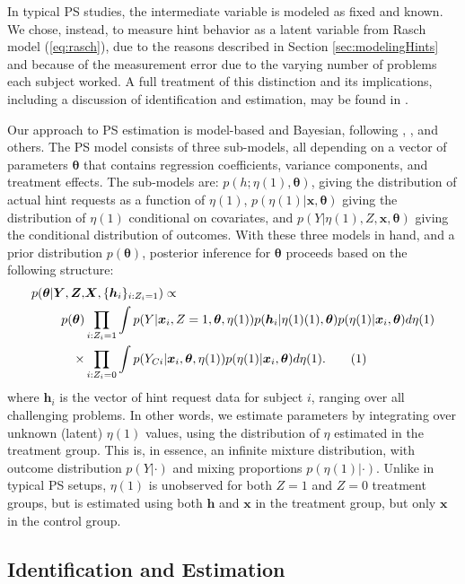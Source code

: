 \documentclass{article}
\newcommand{\yci}{Y_{Ci}}
\newcommand\numberthis{\addtocounter{equation}{1}\tag{\theequation}}
\begin{document}
In typical PS studies, the intermediate variable is modeled as fixed
and known.
We chose, instead, to measure hint behavior as a latent variable from
Rasch model (\ref{eq:rasch}), due to the reasons described in Section
\ref{sec:modelingHints} and because of the measurement error
due to the varying number of problems each subject worked.
A full treatment of this distinction and its implications, including a
discussion of identification and estimation, may be found in
\citet{aoas}.

Our approach to PS estimation is model-based and Bayesian, following
\citet{page2012principal}, \citet{feller2016compared},
\citet{schwartz2011bayesian} and others.
The PS model consists of three sub-models, all depending on a
 vector of parameters $\bm{\theta}$ that contains regression
 coefficients, variance components, and treatment effects.
The sub-models are:
$p(h;\eta(1),\bm{\theta})$, giving the distribution of actual hint
requests as a function of $\eta(1)$, $p(\eta(1)|\bm{x},\bm{\theta})$
giving the distribution of $\eta(1)$ conditional on covariates, and
$p(Y|\eta(1),Z,\bm{x},\bm{\theta})$ giving the conditional
distribution of outcomes.
With these three models in hand, and a prior distribution
$p(\bm{\theta})$, posterior inference for $\bm{\theta}$ proceeds based
on the following structure:
\begin{align*}
p(\bm{\theta}|\bm{Y},\bm{Z},&\bm{X},\{\bm{h}_i\}_{i:Z_i=1})\propto\\
p(\bm{\theta})&\displaystyle\prod_{i: Z_i=1}\int p(Y|\bm{x}_i,Z=1,\bm{\theta},\eta(1))p(\bm{h}_{i}|\eta(1)(1),\bm{\theta})p(\eta(1)|\bm{x}_i,\bm{\theta})d\eta(1)\\
\times&\displaystyle\prod_{i:Z_i=0} \int p(\yci|\bm{x}_i,\bm{\theta},\eta(1))p(\eta(1)|\bm{x}_i,\bm{\theta})d\eta(1).\numberthis\label{eq:posteriorEta}
\end{align*}
where $\bm{h}_i$ is the vector of hint request data for subject $i$,
ranging over all challenging problems.
In other words, we estimate parameters by integrating over unknown
(latent) $\eta(1)$ values, using the distribution of $\eta$ estimated
in the treatment group.
This is, in essence, an infinite mixture distribution, with outcome
distribution $p(Y|\cdot)$ and mixing proportions $p(\eta(1)|\cdot)$.
Unlike in typical PS setups, $\eta(1)$ is unobserved for both $Z=1$
and $Z=0$ treatment groups, but is estimated using both $\bm{h}$ and
$\bm{x}$ in the treatment group, but only $\bm{x}$ in the control
group.

\subsection{Identification and Estimation}
\end{document}
